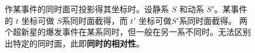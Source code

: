 \begin{figure}[t]
    \centering
    \quad
    \caption{\small 作某事件的同时面可投影得其坐标时。设静系 $S$ 和动系 $S'$。某事件的 $t$ 坐标可做 $S$系同时面截得，而 $t'$ 坐标可做$S'$系同时面截得。
    两个超新星的爆发事件在某系同时，但一般在另一系不同时。无法区别出特定的同时面，此即\textbf{同时的相对性}。}
    \label{fig:simurela}
\end{figure}

